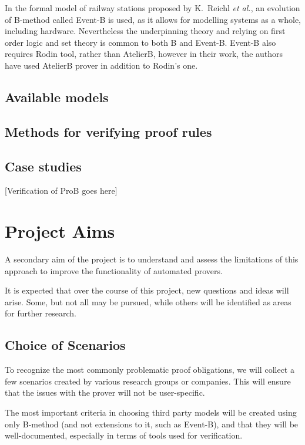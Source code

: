 \documentclass[11pt,journal]{IEEEtran}
\begin{document}
	In the formal model of railway stations proposed by K.~Reichl \emph{et al.}\cite{Railway routing}, an evolution of B-method called Event-B is used, as it allows for modelling systems as a whole, including hardware. Nevertheless the underpinning theory and relying on first order logic and set theory is common to both B and Event-B. Event-B also requires Rodin tool, rather than AtelierB, however in their work, the authors have used AtelierB prover in addition to Rodin's one.
	
	\subsection{Available models}
	
	\subsection{Methods for verifying proof rules}
	
	\subsection{Case studies}
	
	[Verification of ProB goes here]
	
	\section{Project Aims}
	
	A secondary aim of the project is to understand and assess the limitations of this approach to improve the functionality of automated provers.
	
	It is expected that over the course of this project, new questions and ideas will arise. Some, but not all may be pursued, while others will be identified as areas for further research.
	
	\subsection{Choice of Scenarios}
	To recognize the most commonly problematic proof obligations, we will collect a few scenarios created by various research groups or companies. This will ensure that the issues with the prover will not be user-specific. 
	
	The most important criteria in choosing third party models will be created using only B-method (and not extensions to it, such as Event-B), and that they will be well-documented, especially in terms of tools used for verification.
	
\end{document}
